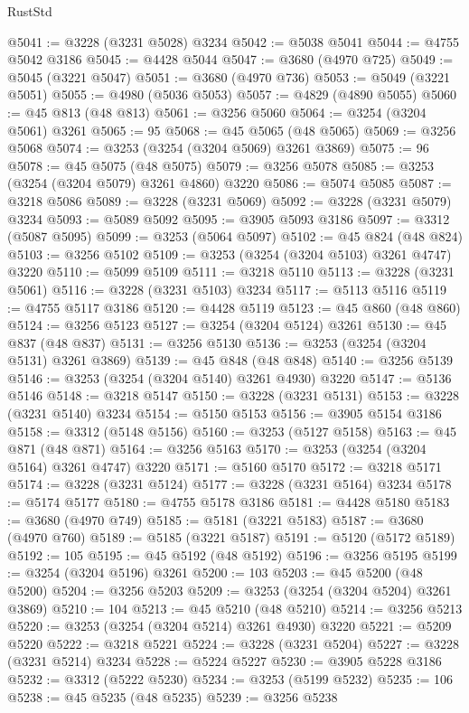 \begin{lexlean}{RustStd}
\begin{coremodule}
{\begin{coremodule}
{{{{{{{{{{{{{{{{{{{{{{{{{{{{{{{{{{{{{@5041 := @3228 (@3231 @5028) @3234
@5042 := @5038 @5041
@5044 := @4755 @5042 @3186
@5045 := @4428 @5044
@5047 := @3680 (@4970 @725)
@5049 := @5045 (@3221 @5047)
@5051 := @3680 (@4970 @736)
@5053 := @5049 (@3221 @5051)
@5055 := @4980 (@5036 @5053)
@5057 := @4829 (@4890 @5055)
@5060 := @45 @813 (@48 @813)
@5061 := @3256 @5060
@5064 := @3254 (@3204 @5061) @3261
@5065 := 95
@5068 := @45 @5065 (@48 @5065)
@5069 := @3256 @5068
@5074 := @3253 (@3254 (@3204 @5069) @3261 @3869)
@5075 := 96
@5078 := @45 @5075 (@48 @5075)
@5079 := @3256 @5078
@5085 := @3253 (@3254 (@3204 @5079) @3261 @4860) @3220
@5086 := @5074 @5085
@5087 := @3218 @5086
@5089 := @3228 (@3231 @5069)
@5092 := @3228 (@3231 @5079) @3234
@5093 := @5089 @5092
@5095 := @3905 @5093 @3186
@5097 := @3312 (@5087 @5095)
@5099 := @3253 (@5064 @5097)
@5102 := @45 @824 (@48 @824)
@5103 := @3256 @5102
@5109 := @3253 (@3254 (@3204 @5103) @3261 @4747) @3220
@5110 := @5099 @5109
@5111 := @3218 @5110
@5113 := @3228 (@3231 @5061)
@5116 := @3228 (@3231 @5103) @3234
@5117 := @5113 @5116
@5119 := @4755 @5117 @3186
@5120 := @4428 @5119
@5123 := @45 @860 (@48 @860)
@5124 := @3256 @5123
@5127 := @3254 (@3204 @5124) @3261
@5130 := @45 @837 (@48 @837)
@5131 := @3256 @5130
@5136 := @3253 (@3254 (@3204 @5131) @3261 @3869)
@5139 := @45 @848 (@48 @848)
@5140 := @3256 @5139
@5146 := @3253 (@3254 (@3204 @5140) @3261 @4930) @3220
@5147 := @5136 @5146
@5148 := @3218 @5147
@5150 := @3228 (@3231 @5131)
@5153 := @3228 (@3231 @5140) @3234
@5154 := @5150 @5153
@5156 := @3905 @5154 @3186
@5158 := @3312 (@5148 @5156)
@5160 := @3253 (@5127 @5158)
@5163 := @45 @871 (@48 @871)
@5164 := @3256 @5163
@5170 := @3253 (@3254 (@3204 @5164) @3261 @4747) @3220
@5171 := @5160 @5170
@5172 := @3218 @5171
@5174 := @3228 (@3231 @5124)
@5177 := @3228 (@3231 @5164) @3234
@5178 := @5174 @5177
@5180 := @4755 @5178 @3186
@5181 := @4428 @5180
@5183 := @3680 (@4970 @749)
@5185 := @5181 (@3221 @5183)
@5187 := @3680 (@4970 @760)
@5189 := @5185 (@3221 @5187)
@5191 := @5120 (@5172 @5189)
@5192 := 105
@5195 := @45 @5192 (@48 @5192)
@5196 := @3256 @5195
@5199 := @3254 (@3204 @5196) @3261
@5200 := 103
@5203 := @45 @5200 (@48 @5200)
@5204 := @3256 @5203
@5209 := @3253 (@3254 (@3204 @5204) @3261 @3869)
@5210 := 104
@5213 := @45 @5210 (@48 @5210)
@5214 := @3256 @5213
@5220 := @3253 (@3254 (@3204 @5214) @3261 @4930) @3220
@5221 := @5209 @5220
@5222 := @3218 @5221
@5224 := @3228 (@3231 @5204)
@5227 := @3228 (@3231 @5214) @3234
@5228 := @5224 @5227
@5230 := @3905 @5228 @3186
@5232 := @3312 (@5222 @5230)
@5234 := @3253 (@5199 @5232)
@5235 := 106
@5238 := @45 @5235 (@48 @5235)
@5239 := @3256 @5238
}}}}}}}}}}}}}}}}}}}}}}}}}}}}}}}}}}}}}
\end{coremodule}}
\end{coremodule}
\end{lexlean}
